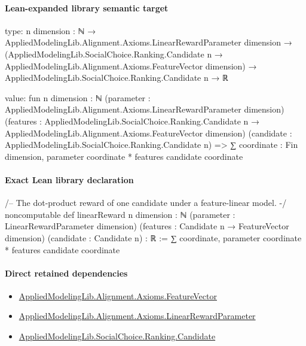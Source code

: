 \documentclass[10pt]{article}
\begin{document}
\paragraph{Lean-expanded library semantic target}
\begin{ReviewVerbatim}
type:
{n dimension : ℕ} →
  AppliedModelingLib.Alignment.Axioms.LinearRewardParameter dimension →
    (AppliedModelingLib.SocialChoice.Ranking.Candidate n →
        AppliedModelingLib.Alignment.Axioms.FeatureVector dimension) →
      AppliedModelingLib.SocialChoice.Ranking.Candidate n → ℝ

value:
fun {n dimension : ℕ} (parameter : AppliedModelingLib.Alignment.Axioms.LinearRewardParameter dimension)
    (features :
      AppliedModelingLib.SocialChoice.Ranking.Candidate n → AppliedModelingLib.Alignment.Axioms.FeatureVector dimension)
    (candidate : AppliedModelingLib.SocialChoice.Ranking.Candidate n) =>
  ∑ coordinate : Fin dimension, parameter coordinate * features candidate coordinate
\end{ReviewVerbatim}

\paragraph{Exact Lean library declaration}
\begin{ReviewVerbatim}
/-- The dot-product reward of one candidate under a feature-linear model. -/
noncomputable def linearReward {n dimension : ℕ}
    (parameter : LinearRewardParameter dimension)
    (features : Candidate n → FeatureVector dimension)
    (candidate : Candidate n) : ℝ :=
  ∑ coordinate, parameter coordinate * features candidate coordinate
\end{ReviewVerbatim}

\paragraph{Direct retained dependencies}
\begin{itemize}\raggedright
\item \hyperlink{library-prerequisite-a0b67c6a143b0b13}{Applied\allowbreak{}Modeling\allowbreak{}Lib.\allowbreak{}Alignment.\allowbreak{}Axioms.\allowbreak{}Feature\allowbreak{}Vector}
\item \hyperlink{library-prerequisite-d58203ca3f4a8c05}{Applied\allowbreak{}Modeling\allowbreak{}Lib.\allowbreak{}Alignment.\allowbreak{}Axioms.\allowbreak{}Linear\allowbreak{}Reward\allowbreak{}Parameter}
\item \hyperlink{library-prerequisite-8c0e6c25845ae78a}{Applied\allowbreak{}Modeling\allowbreak{}Lib.\allowbreak{}Social\allowbreak{}Choice.\allowbreak{}Ranking.\allowbreak{}Candidate}
\end{itemize}
\end{document}
